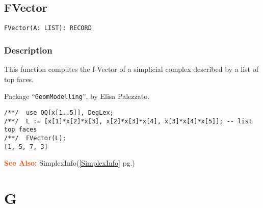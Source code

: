 \documentclass[a4paper]{mybook}
\newenvironment{command}{}{} %
\newcommand\SeeAlso{\par\textcolor{OrangeRed}{\textbf{\large See Also: }}}
\begin{document}
\section{FVector}
\label{FVector}
\begin{command} %


\begin{Verbatim}[label=syntax, rulecolor=\color{MidnightBlue},
frame=single]
FVector(A: LIST): RECORD
\end{Verbatim}


\subsection*{Description}

This function computes the f-Vector of a simplicial complex described by
a list of top faces.
\par 
Package ``\verb&GeomModelling&'', by Elisa Palezzato.
\begin{Verbatim}[label=example, rulecolor=\color{PineGreen}, frame=single]
/**/  use QQ[x[1..5]], DegLex;
/**/  L := [x[1]*x[2]*x[3], x[2]*x[3]*x[4], x[3]*x[4]*x[5]]; -- list top faces
/**/  FVector(L);
[1, 5, 7, 3]
\end{Verbatim}


\SeeAlso %
  SimplexInfo(\ref{SimplexInfo} pg.\pageref{SimplexInfo})
\end{command} %

\chapter{G}  %
\label{G}
\end{document}
